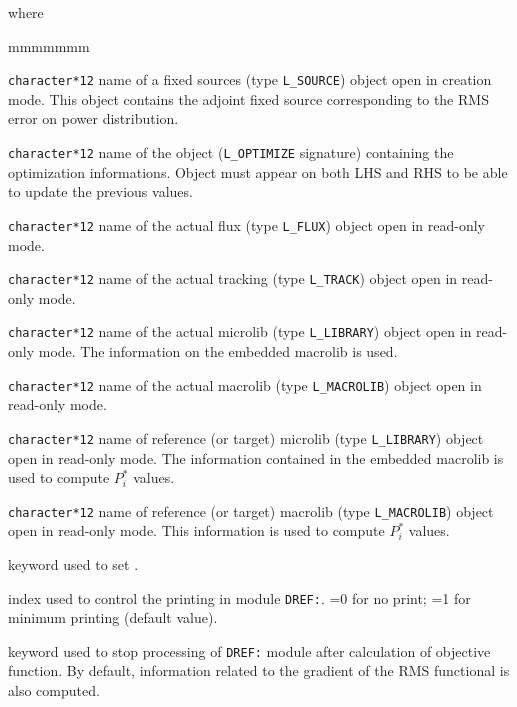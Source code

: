 \noindent where
\begin{ListeDeDescription}{mmmmmmm}

\item[\dusa{SOURCE}] {\tt character*12} name of a {\sc fixed sources} (type {\tt L\_SOURCE}) object open in creation
mode. This object contains the adjoint fixed source corresponding to the RMS error on power distribution.

\item[\dusa{OPTIM}] \texttt{character*12} name of the  object ({\tt L\_OPTIMIZE} signature) containing the
optimization informations. Object  must appear on both LHS and RHS to be able to update the previous values.

\item[\dusa{FLUX}] {\tt character*12} name of the actual {\sc flux} (type {\tt L\_FLUX}) object open in read-only mode.

\item[\dusa{TRACK}] {\tt character*12} name of the actual {\sc tracking} (type {\tt L\_TRACK}) object open in read-only mode.

\item[\dusa{MICRO}] {\tt character*12} name of the actual {\sc microlib} (type {\tt L\_LIBRARY}) object open in read-only mode. The information on
the embedded macrolib is used.

\item[\dusa{MACRO}] {\tt character*12} name of the actual {\sc macrolib} (type {\tt L\_MACROLIB}) object open in read-only mode.

\item[\dusa{MICREF}] {\tt character*12} name of reference (or target) {\sc microlib} (type {\tt L\_LIBRARY}) object open in read-only mode. The
information contained in the embedded macrolib is used to compute $P^*_i$ values.

\item[\dusa{MACREF}] {\tt character*12} name of reference (or target) {\sc macrolib} (type {\tt L\_MACROLIB}) object open in read-only mode. This
information is used to compute $P^*_i$ values.

\item[\moc{EDIT}] keyword used to set .

\item[\dusa{iprint}] index used to control the printing in module {\tt DREF:}. =0 for no print; =1 for minimum printing (default value).

\item[\moc{NODERIV}] keyword used to stop processing of {\tt DREF:} module after calculation of objective function. By default, information
related to the gradient of the RMS functional is also computed.


\end{ListeDeDescription}
